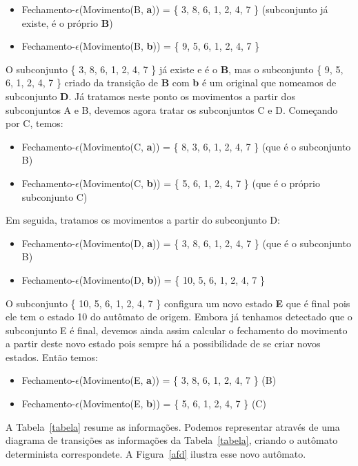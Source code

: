 \documentclass{compiladores}
\newcommand{\vazio}{{\LARGE$\epsilon$}\xspace}
\begin{document}
\begin{itemize}
\item Fechamento-\vazio(Movimento(B, {\bf a})) = \{ 3, 8, 6, 1, 2, 4, 7 \}
(subconjunto já existe, é o próprio {\bf B})
\item Fechamento-\vazio(Movimento(B, {\bf b})) = \{ 9, 5, 6, 1, 2, 4, 7 \} 
\end{itemize}

O subconjunto \{ 3, 8, 6, 1, 2, 4, 7 \} já existe e é o {\bf B}, mas o
subconjunto \{ 9, 5, 6, 1, 2, 4, 7 \} criado da transição de {\bf B}
com {\bf b} é um original que nomeamos de subconjunto {\bf D}.
%
Já tratamos neste ponto os movimentos a partir dos subconjuntos A e B,
devemos agora tratar os subconjuntos C e D. Começando por C, temos:

\begin{itemize}
\item Fechamento-\vazio(Movimento(C, {\bf a})) = \{ 8, 3, 6, 1, 2, 4, 7 \} (que é o subconjunto B) 
\item Fechamento-\vazio(Movimento(C, {\bf b})) = \{ 5, 6, 1, 2, 4, 7 \} (que é o próprio subconjunto C) 
\end{itemize}

Em seguida, tratamos os movimentos a partir do subconjunto D:

\begin{itemize}
\item Fechamento-\vazio(Movimento(D, {\bf a})) = \{ 3, 8, 6, 1, 2, 4, 7 \} (que é o subconjunto B) 
\item Fechamento-\vazio(Movimento(D, {\bf b})) = \{ 10, 5, 6, 1, 2, 4, 7 \}
\end{itemize}

O subconjunto \{ 10, 5, 6, 1, 2, 4, 7 \} configura um novo estado {\bf
  E} que é final pois ele tem o estado 10 do autômato de
origem. Embora já tenhamos detectado que o subconjunto E é final,
devemos ainda assim calcular o fechamento do movimento a partir deste
novo estado pois sempre há a possibilidade de se criar novos
estados. Então temos:

\begin{itemize}
\item Fechamento-\vazio(Movimento(E, {\bf a})) = \{ 3, 8, 6, 1, 2, 4, 7 \} (B) 
\item Fechamento-\vazio(Movimento(E, {\bf b})) = \{ 5, 6, 1, 2, 4, 7 \} (C)
\end{itemize}

A Tabela~\ref{tabela} resume as informações. 
Podemos representar através de uma diagrama de transições as
informações da Tabela~\ref{tabela}, criando o autômato determinista
correspondete. A Figura~\ref{afd} ilustra esse novo autômato.
\end{document}
